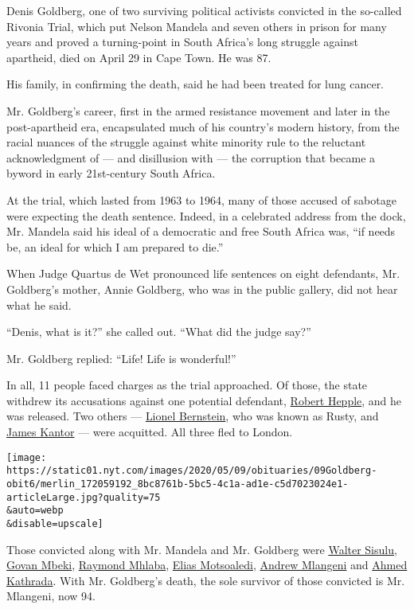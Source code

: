 Denis Goldberg, one of two surviving political activists convicted in
the so-called Rivonia Trial, which put Nelson Mandela and seven others
in prison for many years and proved a turning-point in South Africa's
long struggle against apartheid, died on April 29 in Cape Town. He was
87.

His family, in confirming the death, said he had been treated for lung
cancer.

Mr. Goldberg's career, first in the armed resistance movement and later
in the post-apartheid era, encapsulated much of his country's modern
history, from the racial nuances of the struggle against white minority
rule to the reluctant acknowledgment of --- and disillusion with --- the
corruption that became a byword in early 21st-century South Africa.

At the trial, which lasted from 1963 to 1964, many of those accused of
sabotage were expecting the death sentence. Indeed, in a celebrated
address from the dock, Mr. Mandela said his ideal of a democratic and
free South Africa was, ``if needs be, an ideal for which I am prepared
to die.''

When Judge Quartus de Wet pronounced life sentences on eight defendants,
Mr. Goldberg's mother, Annie Goldberg, who was in the public gallery,
did not hear what he said.

``Denis, what is it?'' she called out. ``What did the judge say?''

Mr. Goldberg replied: ``Life! Life is wonderful!''

In all, 11 people faced charges as the trial approached. Of those, the
state withdrew its accusations against one potential defendant,
\href{https://www.theguardian.com/law/2015/aug/26/sir-bob-hepple}{Robert
Hepple}, and he was released. Two others ---
\href{https://www.theguardian.com/news/2002/jun/26/guardianobituaries1}{Lionel
Bernstein}, who was known as Rusty, and
\href{https://www.sahistory.org.za/people/james-kantor}{James Kantor}
--- were acquitted. All three fled to London.

\texttt{[image: https://static01.nyt.com/images/2020/05/09/obituaries/09Goldberg-obit6/merlin\_172059192\_8bc8761b-5bc5-4c1a-ad1e-c5d7023024e1-articleLarge.jpg?quality=75\\\&auto=webp\\\&disable=upscale]}

Those convicted along with Mr. Mandela and Mr. Goldberg were
\href{https://www.nytimes.com/2003/05/06/world/walter-sisulu-mandela-mentor-and-comrade-dies-at-90.html}{Walter
Sisulu},
\href{https://www.nytimes.com/2001/08/31/world/govan-mbeki-91-an-enemy-of-apartheid-system-dies.html}{Govan
Mbeki},
\href{https://www.theguardian.com/news/2005/feb/25/guardianobituaries.southafrica}{Raymond
Mhlaba},
\href{https://www.sahistory.org.za/people/elias-mathope-motsoaledi}{Elias
Motsoaledi},
\href{https://www.sahistory.org.za/people/andrew-mokete-mlangeni}{Andrew
Mlangeni} and
\href{https://www.nytimes.com/2017/03/28/world/africa/ahmed-kathrada-dies-nelson-mandela.html}{Ahmed
Kathrada}. With Mr. Goldberg's death, the sole survivor of those
convicted is Mr. Mlangeni, now 94.

